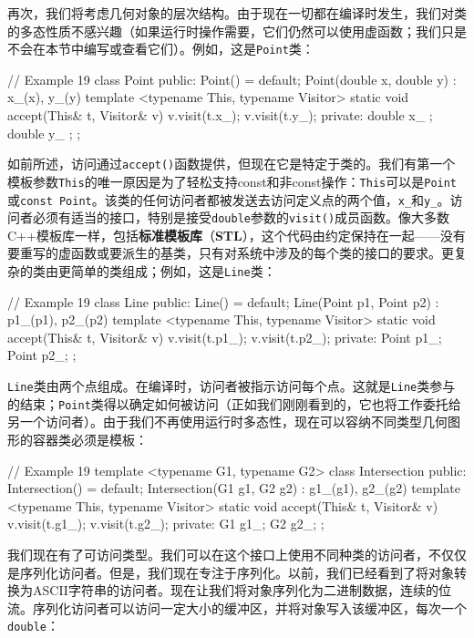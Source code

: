 \begin{code}
{再次，我们将考虑几何对象的层次结构。由于现在一切都在编译时发生，我们对类的多态性质不感兴趣（如果运行时操作需要，它们仍然可以使用虚函数；我们只是不会在本节中编写或查看它们）。例如，这是\texttt{Point}类：

\begin{code}
// Example 19
class Point {
  public:
  Point() = default;
  Point(double x, double y) : x_(x), y_(y) {}
  template <typename This, typename Visitor>
  static void accept(This& t, Visitor& v) {
    v.visit(t.x_);
    v.visit(t.y_);
  }
  private:
  double x_ {};
  double y_ {};
};
\end{code}

如前所述，访问通过\texttt{accept()}函数提供，但现在它是特定于类的。我们有第一个模板参数\texttt{This}的唯一原因是为了轻松支持const和非const操作：\texttt{This}可以是\texttt{Point}或\texttt{const\ Point}。该类的任何访问者都被发送去访问定义点的两个值，\texttt{x\_}和\texttt{y\_}。访问者必须有适当的接口，特别是接受\texttt{double}参数的\texttt{visit()}成员函数。像大多数C++模板库一样，包括\textbf{标准模板库}（\textbf{STL}），这个代码由约定保持在一起——没有要重写的虚函数或要派生的基类，只有对系统中涉及的每个类的接口的要求。更复杂的类由更简单的类组成；例如，这是\texttt{Line}类：

\begin{code}
// Example 19
class Line {
  public:
  Line() = default;
  Line(Point p1, Point p2) : p1_(p1), p2_(p2) {}
  template <typename This, typename Visitor>
  static void accept(This& t, Visitor& v) {
    v.visit(t.p1_);
    v.visit(t.p2_);
  }
  private:
  Point p1_;
  Point p2_;
};
\end{code}

\texttt{Line}类由两个点组成。在编译时，访问者被指示访问每个点。这就是\texttt{Line}类参与的结束；\texttt{Point}类得以确定如何被访问（正如我们刚刚看到的，它也将工作委托给另一个访问者）。由于我们不再使用运行时多态性，现在可以容纳不同类型几何图形的容器类必须是模板：

\begin{code}
// Example 19
template <typename G1, typename G2>
class Intersection {
  public:
  Intersection() = default;
  Intersection(G1 g1, G2 g2) : g1_(g1), g2_(g2) {}
  template <typename This, typename Visitor>
  static void accept(This& t, Visitor& v) {
    v.visit(t.g1_);
    v.visit(t.g2_);
  }
  private:
  G1 g1_;
  G2 g2_;
};
\end{code}

我们现在有了可访问类型。我们可以在这个接口上使用不同种类的访问者，不仅仅是序列化访问者。但是，我们现在专注于序列化。以前，我们已经看到了将对象转换为ASCII字符串的访问者。现在让我们将对象序列化为二进制数据，连续的位流。序列化访问者可以访问一定大小的缓冲区，并将对象写入该缓冲区，每次一个\texttt{double}：

}
\end{code}
